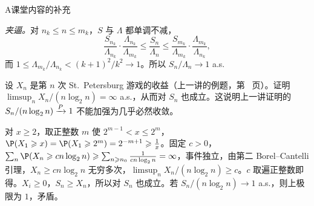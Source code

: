 \begin{exercises}{A}{课堂内容的补充}
\begin{solution}
\emph{夹逼。}对 $n_k\leqslant n\leqslant m_k$，$S$ 与 $\Lambda$ 都单调不减，
\[
\frac{S_{n_k}}{\Lambda_{n_k}}\cdot\frac{\Lambda_{n_k}}{\Lambda_{m_k}}\leqslant\frac{S_n}{\Lambda_n}\leqslant\frac{S_{m_k}}{\Lambda_{m_k}}\cdot\frac{\Lambda_{m_k}}{\Lambda_{n_k}},
\]
而 $1\leqslant\Lambda_{m_k}/\Lambda_{n_k}<(k+1)^2/k^2\to1$。所以 $S_n/\Lambda_n\to1$ a.s.
\end{solution}

\item\label{ex:borel-cantelli:A13} 设 $X_n$ 是第 $n$ 次 St.\ Petersburg 游戏的收益（上一讲的例题，第~\pageref{we:weak-laws:st-petersburg} 页）。证明 $\limsup_nX_n/(n\log_2n)=\infty$ a.s.，从而对 $S_n$ 也成立。这说明上一讲证明的 $S_n/(n\log_2n)\xrightarrow{P}1$ 不能加强为几乎必然收敛。
\begin{solution}
对 $x\geqslant2$，取正整数 $m$ 使 $2^{m-1}<x\leqslant2^m$，$\P(X_1\geqslant x)=\P(X_1\geqslant2^m)=2^{-m+1}\geqslant\frac1x$。固定 $c>0$，$\sum_n\P(X_n\geqslant cn\log_2n)\geqslant\sum_{n\geqslant n_0}\frac1{cn\log_2n}=\infty$，事件独立，由第二 Borel--Cantelli 引理，$X_n\geqslant cn\log_2n$ 无穷多次，$\limsup_nX_n/(n\log_2n)\geqslant c$。$c$ 取遍正整数即得。$X_i\geqslant0$，$S_n\geqslant X_n$，所以对 $S_n$ 也成立。若 $S_n/(n\log_2n)\to1$ a.s.，则上极限为 $1$，矛盾。
\end{solution}
\end{exercises}

